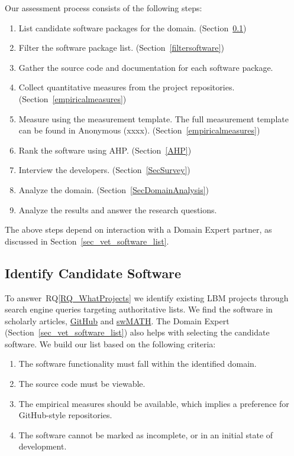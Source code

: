 \documentclass[final, 3p, times, authoryear]{elsarticle}
\newcommand{\rqref}[1]{RQ\ref{#1}}
\begin{document}
Our assessment process consists of the following steps: 

\begin{enumerate}
	\item List candidate software packages for the domain.
	(Section~\ref{identifysoftware})
	\item Filter the software package list. (Section~\ref{filtersoftware})
	\item Gather the source code and documentation for each software package.
	\item Collect quantitative measures from the project repositories.
	(Section~\ref{empiricalmeasures})
	\item Measure using the measurement template.  The full measurement template
	can be found in Anonymous (xxxx)\footnotemark[1]. %
	(Section~\ref{empiricalmeasures})
	\item Rank the software using AHP. (Section~\ref{AHP})
	\item Interview the developers. (Section~\ref{SecSurvey})
	\item Analyze the domain. (Section~\ref{SecDomainAnalysis})
	\item Analyze the results and answer the research questions.
\end{enumerate}

\noindent The above steps depend on interaction with a Domain Expert partner, as
discussed in Section~\ref{sec_vet_software_list}.

\subsection{Identify Candidate Software} \label{identifysoftware}

To answer~\rqref{RQ_WhatProjects} we identify existing LBM projects through
search engine queries targeting authoritative lists. We find the software in
scholarly articles, \href{https://github.com/} {GitHub} and
\href{https://swmath.org/} {swMATH}. The Domain Expert
(Section~\ref{sec_vet_software_list}) also helps with selecting the candidate
software.  We build our list based on the following criteria:

\begin{enumerate}
	\item The software functionality must fall within the identified domain.
	\item The source code must be viewable.
	\item The empirical measures should be available, which implies a preference
	for GitHub-style repositories.
	\item The software cannot be marked as incomplete, or in an initial state of
	development.
\end{enumerate}
\end{document}
